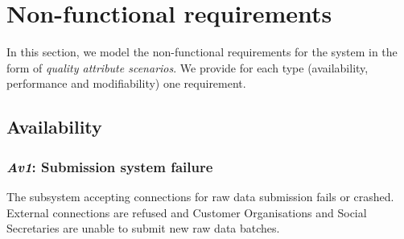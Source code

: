 \documentclass[a4paper,10pt]{article}
\begin{document}
\section{Non-functional requirements}\label{sec:non-functional}
In this section, we model the non-functional requirements for the system in the
form of \emph{quality attribute scenarios}. We provide for each type
(availability, performance and modifiability) one requirement.

\subsection{Availability}
\subsubsection{\emph{Av1}: Submission system failure}
The subsystem accepting connections for raw data submission fails or crashed. External connections are refused and Customer Organisations and Social Secretaries are unable to submit new raw data batches.
\end{document}
